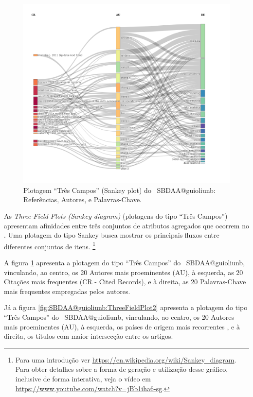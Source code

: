 \begin{figure}
    \centering
    \includegraphics[angle=0,width=1\textwidth]{experiments/guioliunb/AnaliseBibliometrica/SocialBigDataAnalysis/3FSE-referencesXauthorsXkeywords.png}
    \caption{Plotagem ``Três Campos'' (Sankey plot) do \dataset\   SBDAA@guioliunb: Referências, Autores, e Palavras-Chave.}
    \label{fig:SBDAA@guioliunb:ThreeFieldPlot}
\end{figure}

As \textit{Three-Field Plots (Sankey diagram)} (plotagens do tipo ``Três Campos'') apresentam afinidades entre três conjuntos de atributos agregados que ocorrem no \dataset. Uma plotagem do tipo Sankey busca mostrar os principais fluxos entre diferentes conjuntos de itens. \footnote{Para uma introdução ver \url{https://en.wikipedia.org/wiki/Sankey_diagram}. Para obter detalhes sobre a forma de geração e utilização desse gráfico, inclusive de forma interativa, veja o vídeo em \url{https://www.youtube.com/watch?v=jBb1iha6-sg}.} 



A figura \ref{fig:SBDAA@guioliunb:ThreeFieldPlot} apresenta a plotagem do tipo ``Três Campos'' do \dataset\   SBDAA@guioliunb, vinculando, ao centro, os 20 Autores mais proeminentes (AU), à esquerda, as 20 Citações mais frequentes (CR - Cited Records), e à direita, as 20 Palavras-Chave mais frequentes empregadas pelos autores.

Já a figura \ref{fig:SBDAA@guioliunb:ThreeFieldPlot2} apresenta a plotagem do tipo ``Três Campos'' do \dataset\   SBDAA@guioliunb, vinculando, ao centro, os 20 Autores mais proeminentes (AU), à esquerda, os países de origem mais recorrentes , e à direita, os títulos com maior intersecção entre os artigos.



